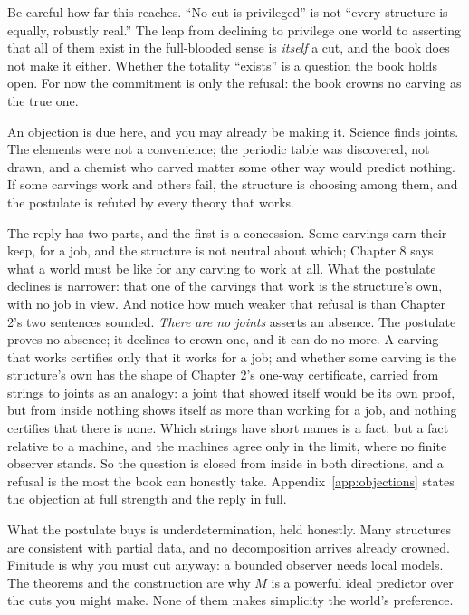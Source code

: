 Be careful how far this reaches. ``No cut is privileged'' is not ``every structure is equally, robustly real.'' The leap from declining to privilege one world to asserting that all of them exist in the full-blooded sense is \emph{itself} a cut, and the book does not make it either. Whether the totality ``exists'' is a question the book holds open. For now the commitment is only the refusal: the book crowns no carving as the true one.

An objection is due here, and you may already be making it. Science finds joints. The elements were not a convenience; the periodic table was discovered, not drawn, and a chemist who carved matter some other way would predict nothing. If some carvings work and others fail, the structure is choosing among them, and the postulate is refuted by every theory that works.

The reply has two parts, and the first is a concession. Some carvings earn their keep, for a job, and the structure is not neutral about which; Chapter 8 says what a world must be like for any carving to work at all. What the postulate declines is narrower: that one of the carvings that work is the structure's own, with no job in view. And notice how much weaker that refusal is than Chapter 2's two sentences sounded. \emph{There are no joints} asserts an absence. The postulate proves no absence; it declines to crown one, and it can do no more. A carving that works certifies only that it works for a job; and whether some carving is the structure's own has the shape of Chapter 2's one-way certificate, carried from strings to joints as an analogy: a joint that showed itself would be its own proof, but from inside nothing shows itself as more than working for a job, and nothing certifies that there is none. Which strings have short names is a fact, but a fact relative to a machine, and the machines agree only in the limit, where no finite observer stands. So the question is closed from inside in both directions, and a refusal is the most the book can honestly take. Appendix~\ref{app:objections} states the objection at full strength and the reply in full.

What the postulate buys is underdetermination, held honestly. Many structures are consistent with partial data, and no decomposition arrives already crowned. Finitude is why you must cut anyway: a bounded observer needs local models. The theorems and the construction are why $M$ is a powerful ideal predictor over the cuts you might make. None of them makes simplicity the world's preference.

